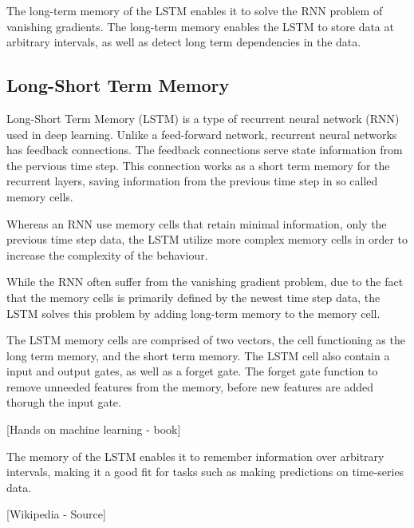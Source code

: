 The long-term memory of the LSTM enables it to solve the RNN problem of vanishing gradients.
The long-term memory enables the LSTM to store data at arbitrary intervals, as well as detect long term dependencies in the data.




\cite[p.~492-493]{Geron2017}







\iffalse
\subsection{Long-Short Term Memory}

Long-Short Term Memory (LSTM) is a type of recurrent neural network (RNN) used in deep learning.
Unlike a feed-forward network, recurrent neural networks has feedback connections.
The feedback connections serve state information from the pervious time step.
This connection works as a short term memory for the recurrent layers, saving information from the previous time step in so called memory cells.

Whereas an RNN use memory cells that retain minimal information, only the previous time step data, the LSTM utilize more complex memory cells in order to increase the complexity of the behaviour.

While the RNN often suffer from the vanishing gradient problem, due to the fact that the memory cells is primarily defined by the newest time step data, the LSTM solves this problem by adding long-term memory to the memory cell.

The LSTM memory cells are comprised of two vectors, the cell functioning as the long term memory, and the short term memory.
The LSTM cell also contain a input and output gates, as well as a forget gate.
The forget gate function to remove unneeded features from the memory, before new features are added thorugh the input gate.

[Hands on machine learning - book]

The memory of the LSTM enables it to remember information over arbitrary intervals, making it a good fit for tasks such as making predictions on time-series data.

[Wikipedia - Source]





